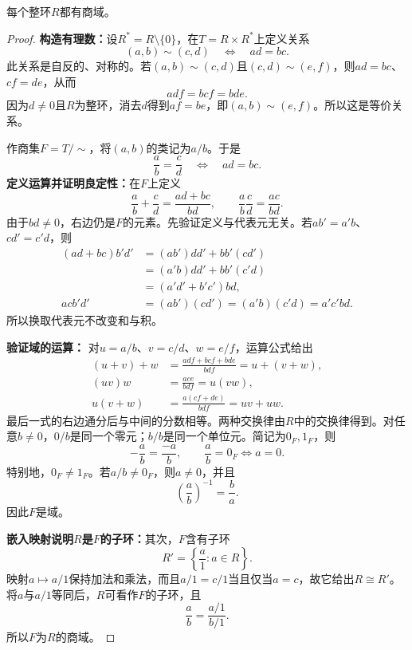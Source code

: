 \begin{theorem}\label{p2:fraction-field}
每个整环$R$都有商域。
\end{theorem}
\begin{proof}
\textbf{构造有理数：}设$R^*=R\setminus\{0\}$，在$T=R\times R^*$上定义关系
\[
(a,b)\sim(c,d)\quad\Longleftrightarrow\quad ad=bc.
\]
此关系是自反的、对称的。若$(a,b)\sim(c,d)$且$(c,d)\sim(e,f)$，则$ad=bc$、$cf=de$，从而
\[
adf=bcf=bde.
\]
因为$d\ne0$且$R$为整环，消去$d$得到$af=be$，即$(a,b)\sim(e,f)$。所以这是等价关系。

作商集$F=T/{\sim}$，将$(a,b)$的类记为$a/b$。于是
\[
\frac ab=\frac cd\quad\Longleftrightarrow\quad ad=bc.
\]
\textbf{定义运算并证明良定性：}在$F$上定义
\[
\frac ab+\frac cd=\frac{ad+bc}{bd},\qquad
\frac ab\frac cd=\frac{ac}{bd}.
\]
由于$bd\ne0$，右边仍是$F$的元素。先验证定义与代表元无关。若$ab'=a'b$、$cd'=c'd$，则
\begin{align*}
(ad+bc)b'd'
&=(ab')dd'+bb'(cd')\\
&=(a'b)dd'+bb'(c'd)\\
&=(a'd'+b'c')bd,\\
acb'd'&=(ab')(cd')=(a'b)(c'd)=a'c'bd.
\end{align*}
所以换取代表元不改变和与积。

\textbf{验证域的运算：}
对$u=a/b$、$v=c/d$、$w=e/f$，运算公式给出
\begin{align*}
(u+v)+w&=\frac{adf+bcf+bde}{bdf}=u+(v+w),\\
(uv)w&=\frac{ace}{bdf}=u(vw),\\
u(v+w)&=\frac{a(cf+de)}{bdf}=uv+uw.
\end{align*}
最后一式的右边通分后与中间的分数相等。两种交换律由$R$中的交换律得到。对任意$b\ne0$，$0/b$是同一个零元；$b/b$是同一个单位元。简记为$0_F,1_F$，则
\[
-\frac ab=\frac{-a}{b},\qquad
\frac ab=0_F\Longleftrightarrow a=0.
\]
特别地，$0_F\ne1_F$。若$a/b\ne0_F$，则$a\ne0$，并且
\[
\left(\frac ab\right)^{-1}=\frac ba.
\]
因此$F$是域。

\textbf{嵌入映射说明$R$是$F$的子环：}其次，$F$含有子环
\[
R'=\left\{\frac a1:a\in R\right\}.
\]
映射$a\mapsto a/1$保持加法和乘法，而且$a/1=c/1$当且仅当$a=c$，故它给出$R\cong R'$。将$a$与$a/1$等同后，$R$可看作$F$的子环，且
\[
\frac ab=\frac{a/1}{b/1}.
\]
所以$F$为$R$的商域。
\end{proof}

